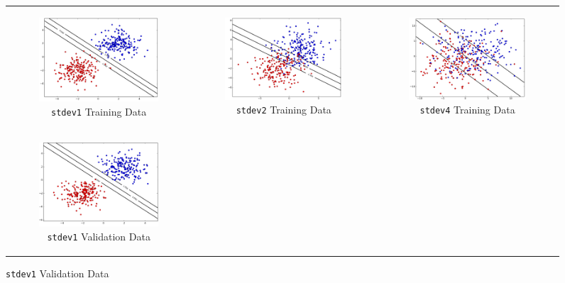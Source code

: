 \documentclass{sigchi}
\begin{document}
\begin{figure}[!ht]
\centering
\begin{tabular}{c c c}
\begin{subfigure}[b]{2.25in}
	\includegraphics[width=2.25in]{plots/1-3/casey/stdev1c1train.png}
	\caption{\texttt{stdev1} Training Data}
\end{subfigure} &

\begin{subfigure}[b]{2.25in}
	\includegraphics[width=2.25in]{plots/1-3/casey/stdev2c1train.png}
	\caption{\texttt{stdev2} Training Data}
\end{subfigure} &

\begin{subfigure}[b]{2.25in}
	\includegraphics[width=2.25in]{plots/1-3/casey/stdev4c1train.png}
	\caption{\texttt{stdev4} Training Data}
\end{subfigure} \\

\begin{subfigure}[b]{2.25in}
	\includegraphics[width=2.25in]{plots/1-3/casey/stdev1c1val.png}
	\caption{\texttt{stdev1} Validation Data}
\end{subfigure} &


\end{tabular}
\end{figure}
\end{document}
